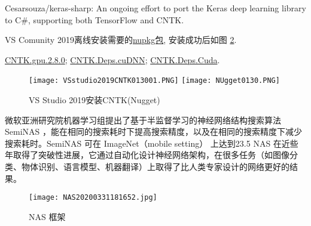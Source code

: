 Cesarsouza/keras-sharp: An ongoing effort to port the Keras deep learning library to C\#, supporting both TensorFlow and CNTK.

VS Comunity 2019离线安装需要的\href{https://www.nuget.org/packages?q=CNTK.GPU}{nupkg包}, 安装成功后如图 \ref{VSstudio2019CNTK013001}.

\href{https://globalcdn.nuget.org/packages/cntk.gpu.2.8.0-rc0.dev20200126.nupkg}{CNTK.gpu.2.8.0};
\href{https://www.nuget.org/api/v2/package/CNTK.Deps.cuDNN/2.8.0-rc0.dev20200127}{CNTK.Deps.cuDNN};
\href{https://www.nuget.org/packages/CNTK.Deps.Cuda/}{CNTK.Deps.Cuda}.

\begin{figure}[H]
\centering
\texttt{[image: VSstudio2019CNTK013001.PNG]}
\texttt{[image: NUgget0130.PNG]}
\caption{VS Studio 2019安装CNTK(Nugget)}
\label{VSstudio2019CNTK013001}
\end{figure}

微软亚洲研究院机器学习组提出了基于半监督学习的神经网络结构搜索算法 SemiNAS ，能在相同的搜索耗时下提高搜索精度，以及在相同的搜索精度下减少搜索耗时。SemiNAS 可在 ImageNet（mobile setting） 上达到23.5%
NAS 在近些年取得了突破性进展，它通过自动化设计神经网络架构，在很多任务（如图像分类、物体识别、语言模型、机器翻译）上取得了比人类专家设计的网络更好的结果。
\begin{figure}[H]
\centering
\texttt{[image: NAS20200331181652.jpg]}
\caption{NAS 框架}
\label{VSstudio2019CNTK013001}
\end{figure}


